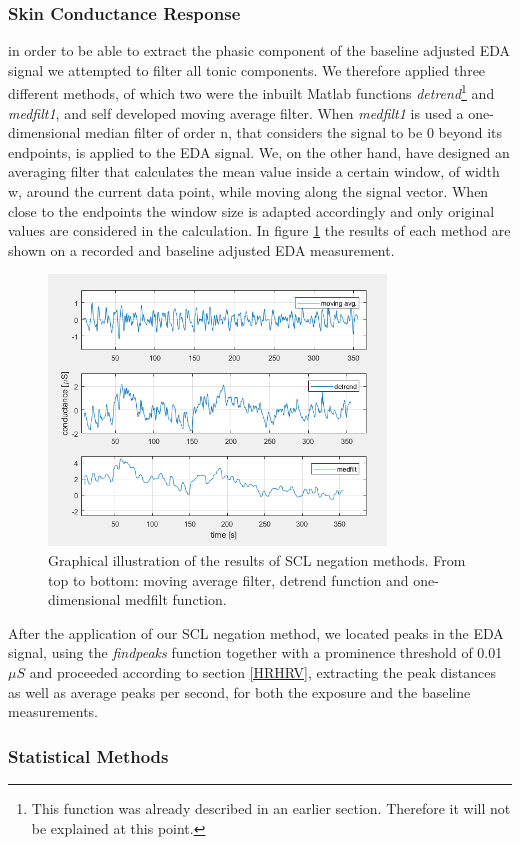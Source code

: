 \subsubsection{Skin Conductance Response}
in order to be able to extract the phasic component of the baseline adjusted EDA signal we attempted to filter all tonic components. We therefore applied three different methods, of which two were the inbuilt Matlab functions \textit{detrend}\footnote{This function was already described in an earlier section. Therefore it will not be explained at this point.} and \textit{medfilt1}, and self developed moving average filter. When \textit{medfilt1} is used a one-dimensional median filter of order n, that considers the signal to be 0 beyond its endpoints, is applied to the EDA signal. We, on the other hand, have designed an averaging filter that calculates the mean value inside a certain window, of width w, around the current data point, while moving along the signal vector. When close to the endpoints the window size is adapted accordingly and only original values are considered in the calculation. In figure \ref{filtcompImg} the results of each method are shown on a recorded and baseline adjusted EDA measurement. 

\newpage
\begin{figure}[ht]
\centering
\includegraphics[width=0.8\textwidth]{images/filtcomp.png}
\caption{Graphical illustration of the results of SCL negation methods. From top to bottom: moving average filter, detrend function and one-dimensional medfilt function.}
\label{filtcompImg}
\end{figure}
   
After the application of our SCL negation method, we located peaks in the EDA signal, using the \textit{findpeaks} function together with a prominence threshold of 0.01 $\mu S$ and proceeded according to section \ref{HRHRV}, extracting the peak distances as well as average peaks per second, for both the exposure and the baseline measurements.

\subsubsection{Statistical Methods}



